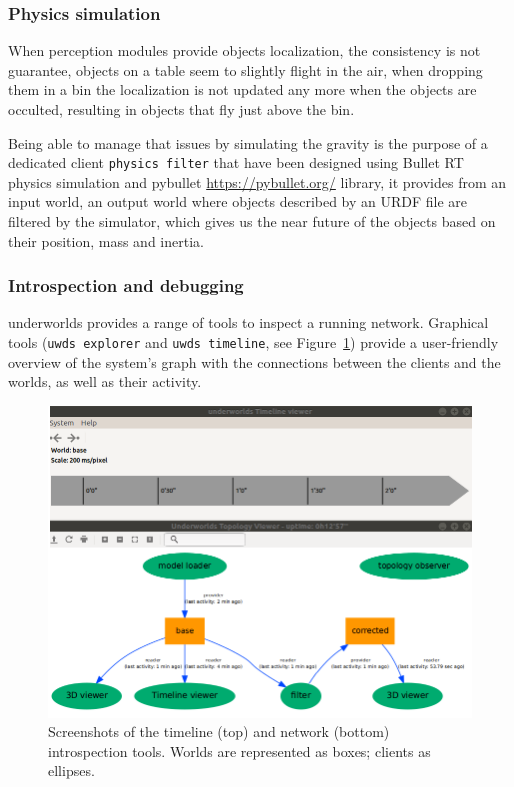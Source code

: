 \documentclass[letterpaper, 10pt, conference]{ieeeconf}
\newcommand{\uwds}{{\sc underworlds}\xspace}
\begin{document}
\subsubsection{Physics simulation}\label{physics}

When perception modules provide objects localization, the consistency is not guarantee, objects on a table seem to slightly flight in the air, when dropping them in a bin the localization is not updated any more when the objects are occulted, resulting in objects that fly just above the bin.

Being able to manage that issues by simulating the gravity is the purpose of a dedicated client  
{\tt physics filter} that have been designed using Bullet RT physics simulation and pybullet \url{https://pybullet.org/} library, it provides from an input world, an output world where objects described by an URDF file are filtered by the simulator, which gives us the near future of the objects based on their position, mass and inertia.

\subsubsection{Introspection and debugging}

\uwds provides a range of tools to inspect a running network. Graphical
tools ({\tt uwds explorer} and {\tt uwds timeline}, see Figure~\ref{fig|explorer})
provide a user-friendly overview of the system's graph with the connections
between the clients and the worlds, as well as their activity.

\begin{figure}
    \centering
    \includegraphics[width=\linewidth]{tools}
    \caption{Screenshots of the timeline (top) and network (bottom)
    introspection tools. Worlds are represented as boxes; clients as ellipses.}
    \label{fig|explorer}
\end{figure}
\end{document}
